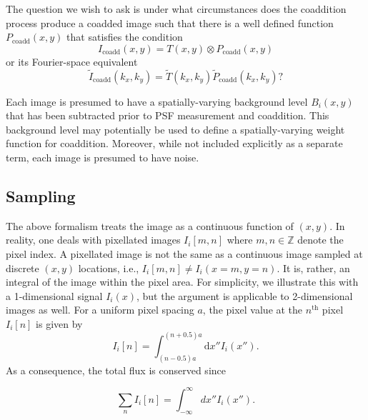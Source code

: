 \documentclass{aastex63}
\begin{document}
The question we wish to ask is under what circumstances does the coaddition process produce a coadded image such that there is a well defined function $P_\text{coadd}(x,y)$ that satisfies the condition
\begin{equation}\label{eq:coaddpsf}
    I_\text{coadd}(x,y) = T(x,y) \otimes P_\text{coadd}(x,y)
\end{equation}
or its Fourier-space equivalent 
\begin{equation}\label{eq:kcoaddpsf}
    \widetilde{I}_\text{coadd}(k_x,k_y) = \widetilde{T}(k_x,k_y) \widetilde{P}_\text{coadd}(k_x,k_y)?
\end{equation}

Each image is presumed to have a spatially-varying background level $B_i(x,y)$ that has been subtracted prior to PSF measurement and coaddition.  This background level may potentially be used to define a spatially-varying weight function for coaddition.  Moreover, while not included explicitly as a separate term, each image is presumed to have noise.

\subsection{Sampling}
\label{sec:sampling}
The above formalism treats the image as a continuous function of $(x,y)$.  In reality, one deals with pixellated images $I_i[m, n]$ where $m, n \in \mathbb{Z}$ denote the pixel index. A pixellated image is not the same as a continuous image sampled at discrete $(x, y)$ locations, i.e., $I_i[m, n] \ne I_i(x=m, y=n)$. It is, rather, an integral of the image within the pixel area. For simplicity, we illustrate this with a 1-dimensional signal $I_i(x)$, but the argument is applicable to 2-dimensional images as well.
For a uniform pixel spacing $a$, the pixel value at the $n^\text{th}$ pixel $I_i[n]$ is given by
\begin{equation}
    I_i[n] = \int_{(n-0.5)a}^{(n+0.5)a} \mathrm{d}x'' I_i(x'').
    \label{eq:pixellated_image}
\end{equation}
As a consequence, the total flux is conserved since
\begin{linenomath}\begin{equation}
    \sum_n I_i[n] = \int_{-\infty}^{\infty} dx'' I_i(x'').
\end{equation}\end{linenomath}
\end{document}
